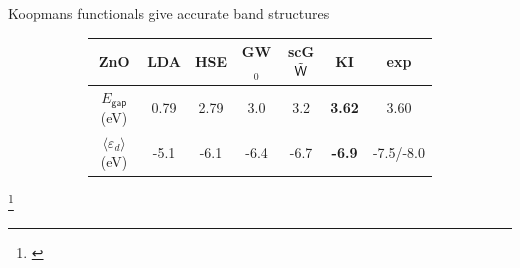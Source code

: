 \documentclass[xcolor=table,aspectratio=169]{beamer}
\newcommand\blfootcite[1]{%
  \begingroup
  \renewcommand\thefootnote{}\footnote{\hspace{-4ex}\cite{#1}}%
  \addtocounter{footnote}{-1}%
  \endgroup
}
\numberwithin{equation}{section}
\begin{document}
\begin{frame}{\normalsize Koopmans functionals give accurate band structures}
\begin{figure}[t]
\begin{subfigure}{0.25\textwidth}
      \end{subfigure}
      \begin{subfigure}{\textwidth} %
         \centering
         \begin{tabular}{c S[table-format = 2.2] S[table-format = 2.2] S[table-format = 2.2] S[table-format = 2.2] >{\color{seaborn_red}\bfseries}S[table-format = 2.2] S[table-format = 2.2]}
            ZnO                                  & {LDA} & {HSE} & {GW$_0$} & {scG$\tilde{\sf W}$} & {KI} & {exp}       \\
            \hline
            $E_\mathsf{gap}$ (eV)                & 0.79  & 2.79  & 3.0      & 3.2                  & 3.62 & 3.60        \\
            $\langle \varepsilon_d \rangle$ (eV) & -5.1  & -6.1  & -6.4     & -6.7                 & -6.9 & {-7.5/-8.0} \\
         \end{tabular}
      \end{subfigure}
   \end{figure}
   \blfootcite{Colonna2022}
\end{frame}
\end{document}
